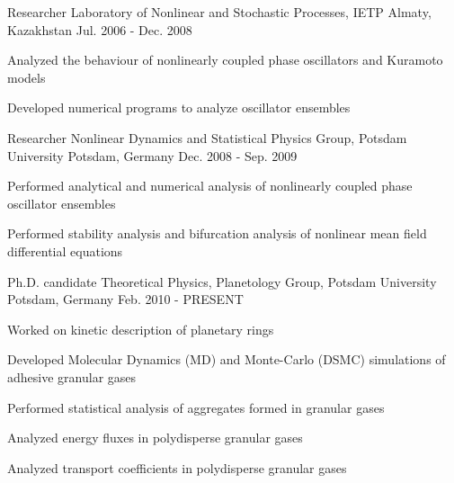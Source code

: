 \begin{cventries}
  \cventry
    {Researcher}
    {Laboratory of Nonlinear and Stochastic Processes, IETP}
    {Almaty, Kazakhstan}
    {Jul. 2006 - Dec. 2008}
    {
      \begin{cvitems}
        \item {Analyzed the behaviour of nonlinearly coupled phase oscillators and Kuramoto models}
        \item {Developed numerical programs to analyze oscillator ensembles}        
      \end{cvitems}
    }
  \cventry
    {Researcher}
    {Nonlinear Dynamics and Statistical Physics Group, Potsdam University}
    {Potsdam, Germany}
    {Dec. 2008 - Sep. 2009}
    {
      \begin{cvitems}
        \item {Performed analytical and numerical analysis of nonlinearly coupled phase oscillator ensembles}
        \item {Performed stability analysis and bifurcation analysis of nonlinear mean field differential equations}
      \end{cvitems}
    }
  \cventry
    {Ph.D. candidate}
    {Theoretical Physics, Planetology Group, Potsdam University}
    {Potsdam, Germany}
    {Feb. 2010 - PRESENT}
    {
      \begin{cvitems}
        \item {Worked on kinetic description of planetary rings}
        \item {Developed Molecular Dynamics (MD) and Monte-Carlo (DSMC) simulations of adhesive granular gases}
        \item {Performed statistical analysis of aggregates formed in granular gases}
        \item {Analyzed energy fluxes in polydisperse granular gases}
        \item {Analyzed transport coefficients in polydisperse granular gases}
      \end{cvitems} 
    }
\end{cventries}
